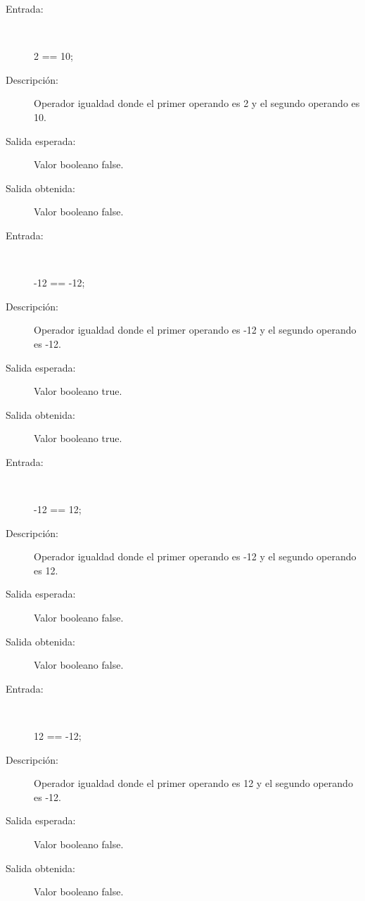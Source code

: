 	\begin{description}
		\item [Entrada:] \hfill \\
\begin{myverbatim}
 2 == 10;
\end{myverbatim}
		\item [Descripción:] Operador igualdad donde el primer operando es 2 y el segundo operando es  10.
		\item [Salida esperada:] Valor booleano false.
		\item [Salida obtenida:] Valor booleano false.
	\end{description}

	\begin{description}
		\item [Entrada:] \hfill \\
\begin{myverbatim}
 -12 == -12;
\end{myverbatim}
		\item [Descripción:] Operador igualdad donde el primer operando es -12 y el segundo operando es  -12.
		\item [Salida esperada:] Valor booleano true.
		\item [Salida obtenida:] Valor booleano true.
	\end{description}

	\begin{description}
		\item [Entrada:] \hfill \\
\begin{myverbatim}
 -12 == 12;
\end{myverbatim}
		\item [Descripción:] Operador igualdad donde el primer operando es -12 y el segundo operando es  12.
		\item [Salida esperada:] Valor booleano false.
		\item [Salida obtenida:] Valor booleano false.
	\end{description}

	\begin{description}
		\item [Entrada:] \hfill \\
\begin{myverbatim}
 12 == -12;
\end{myverbatim}
		\item [Descripción:] Operador igualdad donde el primer operando es 12 y el segundo operando es  -12.
		\item [Salida esperada:] Valor booleano false.
		\item [Salida obtenida:] Valor booleano false.
	\end{description}

